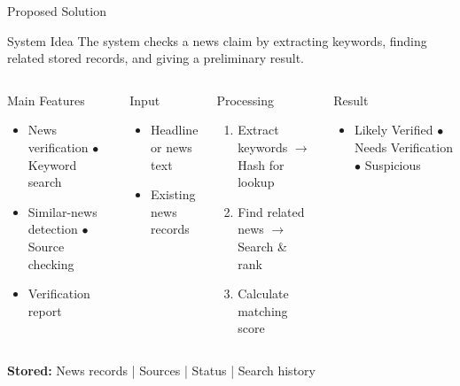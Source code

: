 \documentclass[aspectratio=169,10pt]{beamer}
\def\tightlistspacing{%
  \setlength{\itemsep}{1.2pt}%
  \setlength{\parsep}{0pt}%
  \setlength{\topsep}{1pt}%
  \setlength{\partopsep}{0pt}%
}
\begin{document}
\begin{frame}{Proposed Solution}
\begin{block}{System Idea}
\scriptsize\RaggedRight
The system checks a news claim by extracting keywords, finding related stored records, and giving a preliminary result.
\end{block}

\vspace{1.5mm}
\begin{columns}[T,totalwidth=\textwidth]
\begin{block}{Main Features}
\begin{itemize}\scriptsize\tightlistspacing
\item News verification \quad $\bullet$ Keyword search
\item Similar-news detection \quad $\bullet$ Source checking
\item Verification report
\end{itemize}
\end{block}

\vspace{1mm}
\begin{block}{Input}
\begin{itemize}\scriptsize\tightlistspacing
\item Headline or news text
\item Existing news records
\end{itemize}
\end{block}

\begin{block}{Processing}
\begin{enumerate}\scriptsize\tightlistspacing
\item Extract keywords $\rightarrow$ Hash for lookup
\item Find related news $\rightarrow$ Search \& rank
\item Calculate matching score
\end{enumerate}
\end{block}

\vspace{1mm}
\begin{block}{Result}
\begin{itemize}\scriptsize\tightlistspacing
\item Likely Verified \quad $\bullet$ Needs Verification \quad $\bullet$ Suspicious
\end{itemize}
\end{block}
\end{columns}

\vspace{1.5mm}
\centering\tiny\textbf{Stored:} News records \;|\; Sources \;|\; Status \;|\; Search history
\end{frame}
\end{document}
